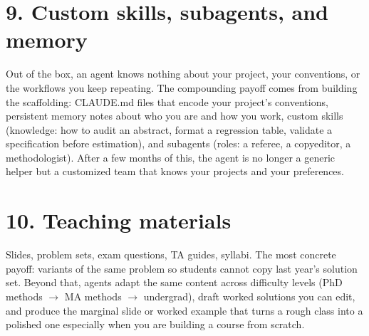 \documentclass[11pt]{article}
\begin{document}
\section*{9. Custom skills, subagents, and memory}

Out of the box, an agent knows nothing about your project, your conventions, or the workflows you keep repeating. The compounding payoff comes from building the scaffolding: CLAUDE.md files that encode your project's conventions, persistent memory notes about who you are and how you work, custom skills (knowledge: how to audit an abstract, format a regression table, validate a specification before estimation), and subagents (roles: a referee, a copyeditor, a methodologist). After a few months of this, the agent is no longer a generic helper but a customized team that knows your projects and your preferences.

\section*{10. Teaching materials}

Slides, problem sets, exam questions, TA guides, syllabi. The most concrete payoff: variants of the same problem so students cannot copy last year's solution set. Beyond that, agents adapt the same content across difficulty levels (PhD methods $\rightarrow$ MA methods $\rightarrow$ undergrad), draft worked solutions you can edit, and produce the marginal slide or worked example that turns a rough class into a polished one \textemdash{} especially when you are building a course from scratch.
\end{document}
